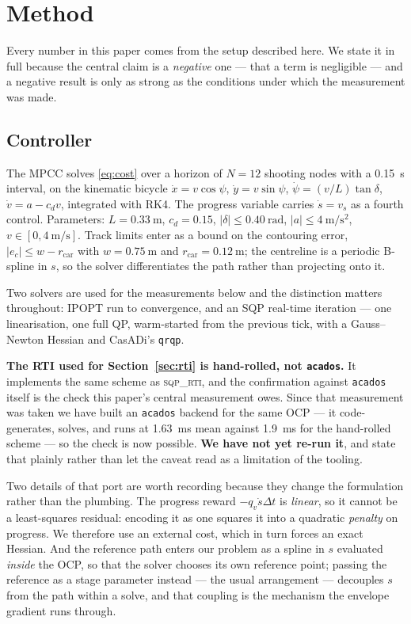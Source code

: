 \documentclass[letterpaper, 10 pt, conference]{ieeeconf}
\begin{document}
\section{Method}\label{sec:method}

Every number in this paper comes from the setup described here. We state it in
full because the central claim is a \emph{negative} one --- that a term is
negligible --- and a negative result is only as strong as the conditions under
which the measurement was made.

\subsection{Controller}
The MPCC solves \eqref{eq:cost} over a horizon of $N = 12$ shooting nodes with
a \SI{0.15}{\second} interval, on the kinematic bicycle
$\dot x = v\cos\psi$, $\dot y = v\sin\psi$,
$\dot\psi = (v/L)\tan\delta$, $\dot v = a - c_d v$, integrated with RK4.
The progress variable carries $\dot s = v_s$ as a fourth control. Parameters:
$L = \SI{0.33}{\meter}$, $c_d = 0.15$, $|\delta| \le \SI{0.40}{\radian}$,
$|a| \le \SI{4}{\meter\per\second\squared}$,
$v \in [0, \SI{4}{\meter\per\second}]$. Track limits enter as a bound on the
contouring error, $|e_c| \le w - r_{\text{car}}$ with $w = \SI{0.75}{\meter}$
and $r_{\text{car}} = \SI{0.12}{\meter}$; the centreline is a periodic B-spline
in $s$, so the solver differentiates the path rather than projecting onto it.

Two solvers are used for the measurements below and the distinction matters
throughout: IPOPT run to convergence, and an SQP real-time iteration --- one
linearisation, one full QP, warm-started from the previous tick, with a
Gauss--Newton Hessian and CasADi's \texttt{qrqp}.

\textbf{The RTI used for Section~\ref{sec:rti} is hand-rolled, not
\texttt{acados}.} It implements the same scheme as \textsc{sqp\_rti}, and the
confirmation against \texttt{acados} itself is the check this paper's central
measurement owes. Since that measurement was taken we have built an
\texttt{acados} backend for the same OCP --- it code-generates, solves, and runs
at \SI{1.63}{\milli\second} mean against \SI{1.9}{\milli\second} for the
hand-rolled scheme --- so the check is now possible. \textbf{We have not yet
re-run it}, and state that plainly rather than let the caveat read as a
limitation of the tooling.

Two details of that port are worth recording because they change the
formulation rather than the plumbing. The progress reward $-q_v \dot s \Delta t$
is \emph{linear}, so it cannot be a least-squares residual: encoding it as one
squares it into a quadratic \emph{penalty} on progress. We therefore use an
external cost, which in turn forces an exact Hessian. And the reference path
enters our problem as a spline in $s$ evaluated \emph{inside} the OCP, so that
the solver chooses its own reference point; passing the reference as a stage
parameter instead --- the usual arrangement --- decouples $s$ from the path
within a solve, and that coupling is the mechanism the envelope gradient runs
through.
\end{document}
